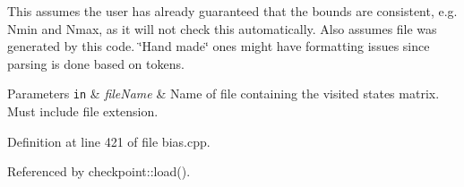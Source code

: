 This assumes the user has already guaranteed that the bounds are consistent, e.\-g. Nmin and Nmax, as it will not check this automatically. Also assumes file was generated by this code. \char`\"{}\-Hand made\char`\"{} ones might have formatting issues since parsing is done based on tokens.


\begin{DoxyParams}[1]{Parameters}
\mbox{\tt in}  & {\em file\-Name} & Name of file containing the visited states matrix. Must include file extension. \\
\hline
\end{DoxyParams}


Definition at line 421 of file bias.\-cpp.



Referenced by checkpoint\-::load().


